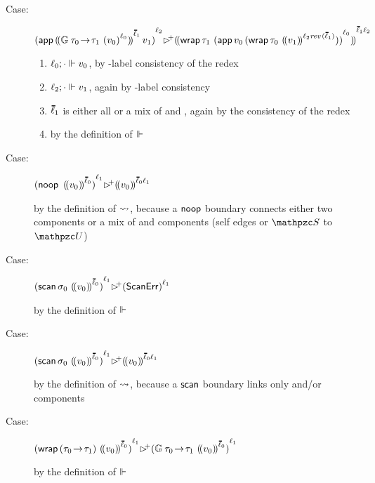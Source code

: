 \documentclass[screen=true, natbib=false, 10pt, sigplan]{acmart}
\begin{document}
{\begin{proofsketch}
\begin{description}
  \item[Case:]
    \(\obars{\eappu{\obbars{\emon{\tfun{\stype_0}{\stype_1}}{\obars{\svalue_0}{\sowner_0}}}{\sownerlist_1}}{\svalue_1}}{\sowner_2} \snrlblbreak
      \obbars{\ewrap{\stype_1}{\obars{\eappu{\svalue_0}{(\ewrap{\stype_0}{\obbars{\svalue_1}{\fconcat{\sowner_2}{\frev{\sownerlist_1}}}})}}{\sowner_0}}}{\fconcat{\sownerlist_1}{\sowner_2}}\)
    \begin{enumerate}
    \item
      $\ell_0; \cdot \Vdash v_0$, by \sdeep{}-label consistency of the redex
    \item
      $\ell_2; \cdot \Vdash v_1$, again by \sdeep{}-label consistency
    \item
      $\sownerlist_1$ is either all \sdeep{} or a mix of \sshallow{} and \suntyped{}, again by the consistency of the redex
    \item
      by the definition of $\Vdash$
    \end{enumerate}

  \item[Case:]
    \(\obars{\enoop{\obbars{\svalue_0}}{\sownerlist_0}}{\sowner_1} \snrlbl \obbars{\svalue_0}{\fconcat{\sownerlist_0}{\sowner_1}}\)
  \item[]
    by the definition of $\rightsquigarrow$, because a $\mathsf{noop}{}$ boundary connects either
     two \sdeep{} components or a mix of \sshallow{} and \suntyped{} components
     (self edges or ${\sS}$ to ${\sU}$)

  \item[Case:]
    \(\obars{\escan{\sshape_0}{\obbars{\svalue_0}{\sownerlist_0}}}{\sowner_1} \snrlbl \obars{\sscanerror}{\sowner_1}\)
  \item[]
    by the definition of $\Vdash$

  \item[Case:]
    \(\obars{\escan{\sshape_0}{\obbars{\svalue_0}{\sownerlist_0}}}{\sowner_1} \snrlbl \obbars{\svalue_0}{\fconcat{\sownerlist_0}{\sowner_1}}\)
  \item[]
    by the definition of $\rightsquigarrow$, because a $\mathsf{scan}{}$ boundary links only \sshallow{} and/or \suntyped{} components


  \item[Case:]
    \(\obars{\ewrap{(\tfun{\stype_0}{\stype_1})}{\obbars{\svalue_0}{\sownerlist_0}}}{\sowner_1} \snrlbl \obars{\emon{\tfun{\stype_0}{\stype_1}}{\obbars{\svalue_0}{\sownerlist_0}}}{\sowner_1}\)
  \item[]
    by the definition of $\Vdash$

  \end{description}
  \vspace{-3ex}
\end{proofsketch}}
\end{document}

